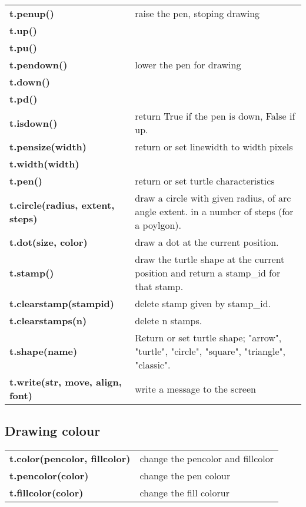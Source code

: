 \documentclass{article}
\begin{document}
\begin{tabularx}{\textwidth}{p{}X}
\textbf{t.penup()} & raise the pen, stoping drawing \\
\textbf{t.up()} & \\
\textbf{t.pu()} & \\
\textbf{t.pendown()} & lower the pen for drawing \\
\textbf{t.down()} & \\
\textbf{t.pd()} & \\
\textbf{t.isdown()} & return True if the pen is down, False if up. \\
\textbf{t.pensize(width)} & return or set linewidth to width pixels \\
\textbf{t.width(width)} & \\
\textbf{t.pen()} & return or set turtle characteristics \\
\textbf{t.circle(radius, extent, steps)} & draw a circle with given radius, of arc angle extent. in a number of steps (for a poylgon). \\
\textbf{t.dot(size, color)} & draw a dot at the current position. \\
\textbf{t.stamp()} & draw the turtle shape at the current position and return a stamp\_id for that stamp. \\
\textbf{t.clearstamp(stampid)} & delete stamp given by stamp\_id. \\
\textbf{t.clearstamps(n)} & delete n stamps. \\
\textbf{t.shape(name)} & Return or set turtle shape; "arrow", "turtle", "circle", "square", "triangle", "classic". \\
\textbf{t.write(str, move, align, font)} & write a message to the screen \\
\end{tabularx}

\subsection*{Drawing colour}

\begin{tabularx}{\textwidth}{p{}X}
\textbf{t.color(pencolor, fillcolor)} & change the pencolor and fillcolor \\
\textbf{t.pencolor(color)} & change the pen colour \\
\textbf{t.fillcolor(color)} & change the fill colorur \\
\end{tabularx}
\end{document}

